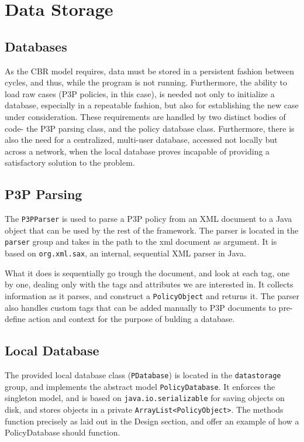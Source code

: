 \section{Data Storage}

\subsection{Databases}

As the CBR model requires, data must be stored in a persistent fashion between cycles, and thus, while the program is not running. Furthermore, the ability to load raw cases (P3P policies, in this case), is needed not only to initialize a database, especially in a repeatable fashion, but also for establishing the new case under consideration. These requirements are handled by two distinct bodies of code- the P3P parsing class, and the policy database class. Furthermore, there is also the need for a centralized, multi-user database, accessed not locally but across a network, when the local database proves incapable of providing a satisfactory solution to the problem.

\subsection{P3P Parsing}  %
The \texttt{P3PParser} is used to parse a P3P policy from an XML document to a Java object that can be used by the rest of the framework. The parser is located in the \texttt{parser} group and takes in the path to the xml document as argument. It is based on \texttt{org.xml.sax}, an internal, sequential XML parser in Java.

What it does is sequentially go trough the document, and look at each tag, one by one, dealing only with the tags and attributes we are interested in. It collects information as it parses, and construct a \texttt{PolicyObject} and returns it. The parser also handles custom tags that can be added manually to P3P documents to pre-define action and context for the purpose of bulding a database.

\subsection{Local Database}
The provided local database class (\texttt{PDatabase}) is located in the \texttt{datastorage} group, and implements the abstract model \texttt{PolicyDatabase}. It enforces the singleton model, and is based on \texttt{java.io.serializable} for saving objects on disk, and stores objects in a private \texttt{ArrayList<PolicyObject>}. The methods function precisely as laid out in the Design section, and offer an example of how a PolicyDatabase should function.

